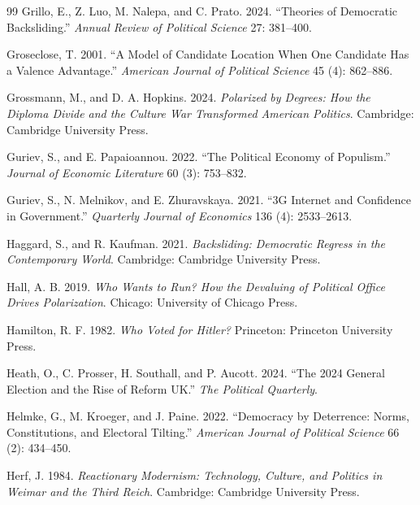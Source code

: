 \documentclass[12pt,letterpaper]{article}
\begin{document}
\begin{thebibliography}{99}
Grillo, E., Z. Luo, M. Nalepa, and C. Prato. 2024. ``Theories of Democratic Backsliding.'' \textit{Annual Review of Political Science} 27: 381--400.

Groseclose, T. 2001. ``A Model of Candidate Location When One Candidate Has a Valence Advantage.'' \textit{American Journal of Political Science} 45 (4): 862--886.

Grossmann, M., and D. A. Hopkins. 2024. \textit{Polarized by Degrees: How the Diploma Divide and the Culture War Transformed American Politics}. Cambridge: Cambridge University Press.

Guriev, S., and E. Papaioannou. 2022. ``The Political Economy of Populism.'' \textit{Journal of Economic Literature} 60 (3): 753--832.

Guriev, S., N. Melnikov, and E. Zhuravskaya. 2021. ``3G Internet and Confidence in Government.'' \textit{Quarterly Journal of Economics} 136 (4): 2533--2613.

Haggard, S., and R. Kaufman. 2021. \textit{Backsliding: Democratic Regress in the Contemporary World}. Cambridge: Cambridge University Press.

Hall, A. B. 2019. \textit{Who Wants to Run? How the Devaluing of Political Office Drives Polarization}. Chicago: University of Chicago Press.

Hamilton, R. F. 1982. \textit{Who Voted for Hitler?} Princeton: Princeton University Press.

Heath, O., C. Prosser, H. Southall, and P. Aucott. 2024. ``The 2024 General Election and the Rise of Reform UK.'' \textit{The Political Quarterly}.

Helmke, G., M. Kroeger, and J. Paine. 2022. ``Democracy by Deterrence: Norms, Constitutions, and Electoral Tilting.'' \textit{American Journal of Political Science} 66 (2): 434--450.

Herf, J. 1984. \textit{Reactionary Modernism: Technology, Culture, and Politics in Weimar and the Third Reich}. Cambridge: Cambridge University Press.


\end{thebibliography}
\end{document}

